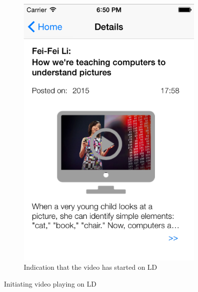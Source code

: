 \begin{figure}
\begin{subfigure}[b]{0.3\textwidth}
        \includegraphics[width=\textwidth]{playSDc}
        \caption{Indication that the video has started on LD}
        \label{fig:figure45c}
    \end{subfigure}
    \caption{Initiating video playing on LD}\label{fig:figure45}
\end{figure}
